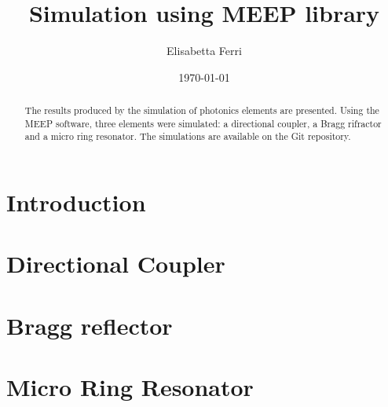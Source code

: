 \documentclass[a4paper]{article}
\title{Simulation using MEEP library}
\author{Elisabetta Ferri}
\date{\today}
\begin{document}
\maketitle
 
\begin{abstract}

The results produced by the simulation of photonics elements are presented. Using the MEEP software, three elements were simulated: a directional coupler, a Bragg rifractor and a micro ring resonator. The simulations are available on the Git repository\cite{Git_repo}.

\end{abstract}

\section{Introduction}


\section{Directional Coupler}


\section{Bragg reflector}


\section{Micro Ring Resonator}


\printbibliography
\end{document}
